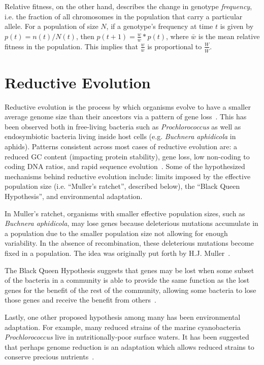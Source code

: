 Relative fitness, on the other hand, describes the change in genotype \textit{frequency}, i.e. the fraction of all chromosomes in the population that carry a particular allele. For a population of size $N$, if a genotype's frequency at time $t$ is given by $p(t) = n(t)/N(t)$, then $p(t+1) = \frac{w}{\bar{w}}*p(t)$, where $\bar{w}$ is the mean relative fitness in the population. This implies that $\frac{w}{\bar{w}}$ is proportional to $\frac{W}{\bar{W}}$. 

\section{Reductive Evolution}\label{reductive_evolution}
Reductive evolution is the process by which organisms evolve to have a smaller average genome size than their ancestors via a pattern of gene loss~\cite{wilcox2003consequences}. This has been observed both in free-living bacteria such as \textit{Prochlorococcus} as well as endosymbiotic bacteria living inside host cells (e.g. \textit{Buchnera aphidicola} in aphids). Patterns consistent across most cases of reductive evolution are: a reduced GC content (impacting protein stability), gene loss, low non-coding to coding DNA ratios, and rapid sequence evolution~\cite{Batut.2014}. Some of the hypothesized mechanisms behind reductive evolution include: limits imposed by the effective population size (i.e. ``Muller's ratchet'', described below), the ``Black Queen Hypothesis'', and environmental adaptation. 

In Muller's ratchet, organisms with smaller effective population sizes, such as \textit{Buchnera aphidicola}, may lose genes because deleterious mutations accumulate in a population due to the smaller population size not allowing for enough variability. In the absence of recombination, these deleterious mutations become fixed in a population. The idea was originally put forth by H.J. Muller~\cite{MullersRatchet}.

The Black Queen Hypothesis suggests that genes may be lost when some subset of the bacteria in a community is able to provide the same function as the lost genes for the benefit of the rest of the community, allowing some bacteria to lose those genes and receive the benefit from others~\cite{morris2012black}. 

Lastly, one other proposed hypothesis among many has been environmental adaptation. For example, many reduced strains of the marine cyanobacteria \textit{Prochlorococcus} live in nutritionally-poor surface waters. It has been suggested that perhaps genome reduction is an adaptation which allows reduced strains to conserve precious nutrients~\cite{rocap2003genome, dufresne2005accelerated}. 

